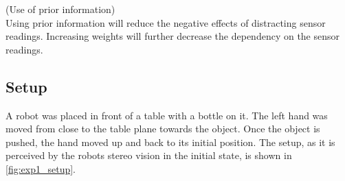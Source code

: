\begin{hypothesis}(Use of prior information)\\
Using prior information will reduce the negative effects of distracting sensor readings. Increasing weights will further decrease the dependency on the sensor readings.
\label{hyp:prior_information}
\end{hypothesis}


\subsection{Setup}

A robot was placed in front of a table with a bottle on it. The left hand was moved from close to the table plane towards the object. Once the object is pushed, the hand moved up and back to its initial position.
The setup, as it is perceived by the robots stereo vision in the initial state, is shown in \cref{fig:exp1_setup}.

%


